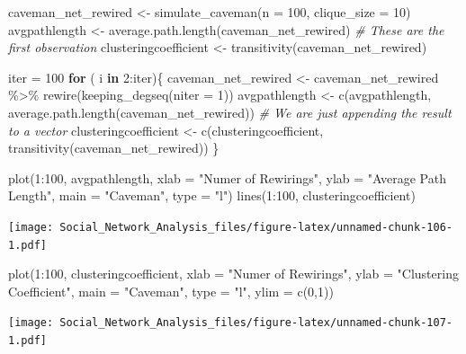 \documentclass[
]{book}
\newenvironment{Shaded}{\begin{snugshade}}{\end{snugshade}}
\newcommand{\AttributeTok}[1]{\textcolor[rgb]{0.77,0.63,0.00}{#1}}
\newcommand{\CommentTok}[1]{\textcolor[rgb]{0.56,0.35,0.01}{\textit{#1}}}
\newcommand{\ControlFlowTok}[1]{\textcolor[rgb]{0.13,0.29,0.53}{\textbf{#1}}}
\newcommand{\DecValTok}[1]{\textcolor[rgb]{0.00,0.00,0.81}{#1}}
\newcommand{\FunctionTok}[1]{\textcolor[rgb]{0.00,0.00,0.00}{#1}}
\newcommand{\NormalTok}[1]{#1}
\newcommand{\OtherTok}[1]{\textcolor[rgb]{0.56,0.35,0.01}{#1}}
\newcommand{\SpecialCharTok}[1]{\textcolor[rgb]{0.00,0.00,0.00}{#1}}
\newcommand{\StringTok}[1]{\textcolor[rgb]{0.31,0.60,0.02}{#1}}
\begin{document}
\begin{Shaded}
\begin{Highlighting}[]
\NormalTok{caveman\_net\_rewired }\OtherTok{\textless{}{-}} \FunctionTok{simulate\_caveman}\NormalTok{(}\AttributeTok{n =} \DecValTok{100}\NormalTok{, }\AttributeTok{clique\_size =} \DecValTok{10}\NormalTok{)}
\NormalTok{avgpathlength }\OtherTok{\textless{}{-}} \FunctionTok{average.path.length}\NormalTok{(caveman\_net\_rewired) }\CommentTok{\# These are the first observation}
\NormalTok{clusteringcoefficient }\OtherTok{\textless{}{-}} \FunctionTok{transitivity}\NormalTok{(caveman\_net\_rewired)}

\NormalTok{iter }\OtherTok{=} \DecValTok{100}
\ControlFlowTok{for}\NormalTok{ ( i }\ControlFlowTok{in} \DecValTok{2}\SpecialCharTok{:}\NormalTok{iter)\{}
\NormalTok{  caveman\_net\_rewired }\OtherTok{\textless{}{-}}\NormalTok{ caveman\_net\_rewired }\SpecialCharTok{\%\textgreater{}\%} \FunctionTok{rewire}\NormalTok{(}\FunctionTok{keeping\_degseq}\NormalTok{(}\AttributeTok{niter =} \DecValTok{1}\NormalTok{))}
\NormalTok{  avgpathlength }\OtherTok{\textless{}{-}} \FunctionTok{c}\NormalTok{(avgpathlength, }\FunctionTok{average.path.length}\NormalTok{(caveman\_net\_rewired)) }\CommentTok{\# We are just appending the result to a vector}
\NormalTok{  clusteringcoefficient }\OtherTok{\textless{}{-}} \FunctionTok{c}\NormalTok{(clusteringcoefficient, }\FunctionTok{transitivity}\NormalTok{(caveman\_net\_rewired))}
\NormalTok{\}}

\FunctionTok{plot}\NormalTok{(}\DecValTok{1}\SpecialCharTok{:}\DecValTok{100}\NormalTok{, avgpathlength, }\AttributeTok{xlab =} \StringTok{"Numer of Rewirings"}\NormalTok{, }\AttributeTok{ylab =} \StringTok{"Average Path Length"}\NormalTok{, }\AttributeTok{main =} \StringTok{"Caveman"}\NormalTok{, }\AttributeTok{type =} \StringTok{"l"}\NormalTok{)}
\FunctionTok{lines}\NormalTok{(}\DecValTok{1}\SpecialCharTok{:}\DecValTok{100}\NormalTok{, clusteringcoefficient)}
\end{Highlighting}
\end{Shaded}

\texttt{[image: Social\_Network\_Analysis\_files/figure-latex/unnamed-chunk-106-1.pdf]}

\begin{Shaded}
\begin{Highlighting}[]
\FunctionTok{plot}\NormalTok{(}\DecValTok{1}\SpecialCharTok{:}\DecValTok{100}\NormalTok{, clusteringcoefficient, }\AttributeTok{xlab =} \StringTok{"Numer of Rewirings"}\NormalTok{, }\AttributeTok{ylab =} \StringTok{"Clustering Coefficient"}\NormalTok{, }\AttributeTok{main =} \StringTok{"Caveman"}\NormalTok{, }\AttributeTok{type =} \StringTok{"l"}\NormalTok{, }\AttributeTok{ylim =} \FunctionTok{c}\NormalTok{(}\DecValTok{0}\NormalTok{,}\DecValTok{1}\NormalTok{))}
\end{Highlighting}
\end{Shaded}

\texttt{[image: Social\_Network\_Analysis\_files/figure-latex/unnamed-chunk-107-1.pdf]}

  
\end{document}
